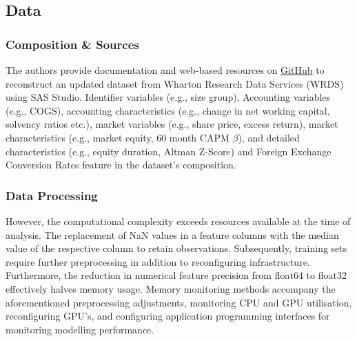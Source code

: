 \documentclass[12pt]{article}
\begin{document}
\subsection{Data} \label{dss}
\subsubsection{Composition \& Sources}
The authors provide documentation and web-based resources on \href{https://github.com/bkelly-lab/ReplicationCrisis}{GitHub} to reconstruct an updated dataset from Wharton Research Data Services (WRDS) using SAS Studio.
Identifier variables (e.g., size group), Accounting variables (e.g., COGS), accounting characteristics (e.g., change in net working capital, solvency ratios etc.), market variables (e.g., share price, excess return), market characteristics (e.g., market equity, 60 month CAPM $\beta$), 
and detailed characteristics (e.g., equity duration, Altman Z-Score) and Foreign Exchange Conversion Rates feature in the dataset's composition.
\subsubsection{Data Processing} \label{data-processing}
However, the computational complexity exceeds resources available at the time of analysis.
The replacement of NaN values in a feature columns with the median value of the respective column to retain observations.
Subsequently, training sets require further preprocessing in addition to reconfiguring infrastructure.
Furthermore, the reduction in numerical feature precision from float64 to float32 effectively halves memory usage. 
Memory monitoring methods accompany the aforementioned preprocessing adjustments, monitoring CPU and GPU utilisation, reconfiguring GPU's, and configuring application programming interfaces for monitoring modelling performance.
\end{document}

